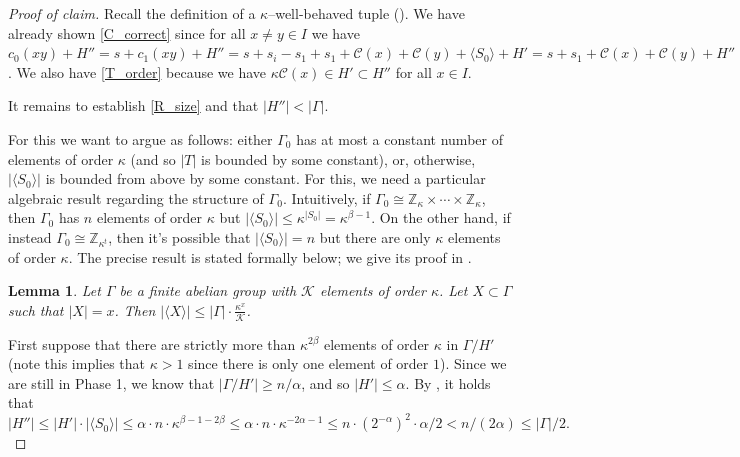 \documentclass{article}
\newcommand{\beq}[1]{\begin{equation}\label{#1}}
\newcommand{\enq}[0]{\end{equation}}
\newcommand{\cC}{\mathcal{C} }
\newcommand{\cK}{\mathcal{K} }
\newtheorem{lemma}[theorem]{Lemma}
\theoremstyle{definition}
\newenvironment{subproof}[1][\proofname]{%
  \renewcommand{\qedsymbol}{$\blacksquare$}%
  \begin{proof}[#1]%
}{%
  \end{proof}%
}
\begin{document}
\begin{subproof}[Proof of claim]
Recall the definition of a $\kappa$--well-behaved tuple (). We have already shown \cref{C_correct} since for all $x\neq y\in I$ we have $c_0(xy)+H''=s+c_1(xy)+H''=s+s_i-s_1+s_1+\cC(x)+\cC(y)+\langle S_0\rangle +H'=s+s_1+\cC(x)+\cC(y)+H''$.
We also have \cref{T_order} because we have $\kappa \cC(x)\in H'\subset H''$ for all $x\in I$.

It remains to establish \cref{R_size} and that $|H''|<|\Gamma|$.

For this we want to argue as follows: either $\Gamma_0$ has at most a constant number of elements of order $\kappa$ (and so $|T|$ is bounded by some constant), or, otherwise, $|\langle S_0\rangle|$ is bounded from above by some constant.
For this, we need a particular algebraic result regarding the structure of $\Gamma_0$. Intuitively, if $\Gamma_0\cong \mathbb{Z}_\kappa \times \cdots  \times \mathbb{Z}_\kappa$, then $\Gamma_0$ has $n$ elements of order $\kappa$ but $|\langle S_0\rangle |\leq \kappa^{|S_0|}=\kappa^{\beta-1}$. On the other hand, if instead $\Gamma_0\cong \mathbb{Z}_{\kappa^t}$, then it's possible that $|\langle S_0\rangle|=n$ but there are only $\kappa$ elements of order $\kappa$. The precise result is stated formally below; we give its proof in .

\begin{lemma}\label{algebra2}
    Let $\Gamma$ be a finite abelian group with $\cK$ elements of order $\kappa$. Let $X\subset \Gamma$ such that $|X|=x$. Then $|\langle X \rangle|\leq |\Gamma|\cdot \frac{\kappa^{x}}{\cK}$.
\end{lemma}

First suppose that there are strictly more than $\kappa^{2\beta}$ elements of order $\kappa$ in $\Gamma/H'$ (note this implies that $\kappa>1$ since there is only one element of order $1$). Since we are still in Phase 1, we know that $|\Gamma/H'|\geq n/\alpha$, and so $|H'|\leq\alpha$. By , it holds that 
\beq{bdH''}|H''|\leq |H'|\cdot |\langle S_0\rangle|\leq \alpha \cdot n\cdot \kappa^{\beta-1-2\beta} \leq \alpha \cdot n\cdot \kappa^{-2\alpha-1} \leq n\cdot (2^{-\alpha})^2\cdot \alpha/2 <  n/(2\alpha) \le |\Gamma|/2.\enq


\end{subproof}
\end{document}
